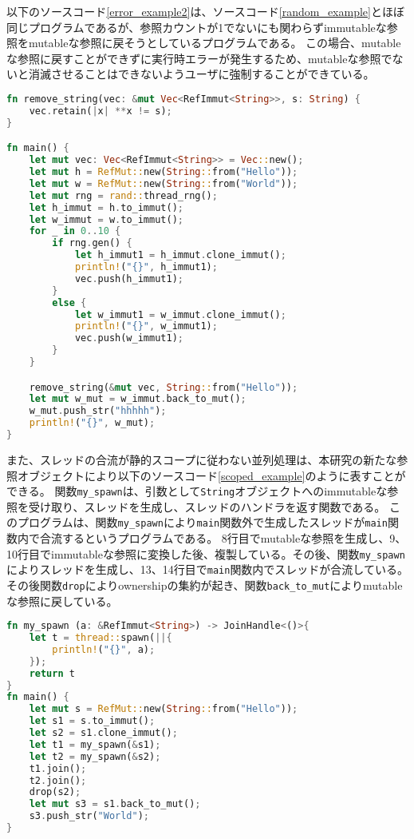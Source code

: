 \documentclass{sumiilab-paper}
\theoremstyle{mystyle}
\numberwithin{definition}{chapter} %
\begin{document}
以下のソースコード\ref{error_example2}は、ソースコード\ref{random_example}とほぼ同じプログラムであるが、参照カウントが1でないにも関わらずimmutableな参照をmutableな参照に戻そうとしているプログラムである。
この場合、mutableな参照に戻すことができずに実行時エラーが発生するため、mutableな参照でないと消滅させることはできないようユーザに強制することができている。
\begin{lstlisting}[language=Rust, caption=mutableな参照へ戻せないことを検出する例, label=error_example2, captionpos=b]
fn remove_string(vec: &mut Vec<RefImmut<String>>, s: String) {
    vec.retain(|x| **x != s);
}

fn main() {
    let mut vec: Vec<RefImmut<String>> = Vec::new();
    let mut h = RefMut::new(String::from("Hello"));
    let mut w = RefMut::new(String::from("World"));
    let mut rng = rand::thread_rng();
    let h_immut = h.to_immut();
    let w_immut = w.to_immut();
    for _ in 0..10 {
        if rng.gen() {
            let h_immut1 = h_immut.clone_immut();
            println!("{}", h_immut1);
            vec.push(h_immut1);
        }
        else {
            let w_immut1 = w_immut.clone_immut();
            println!("{}", w_immut1);
            vec.push(w_immut1);
        }
    }

    remove_string(&mut vec, String::from("Hello"));
    let mut w_mut = w_immut.back_to_mut();
    w_mut.push_str("hhhhh");
    println!("{}", w_mut);
}
\end{lstlisting}

また、スレッドの合流が静的スコープに従わない並列処理は、本研究の新たな参照オブジェクトにより以下のソースコード\ref{scoped_example}のように表すことができる。
関数\texttt{my\_spawn}は、引数として\texttt{String}オブジェクトへのimmutableな参照を受け取り、スレッドを生成し、スレッドのハンドラを返す関数である。
このプログラムは、関数\texttt{my\_spawn}により\texttt{main}関数外で生成したスレッドが\texttt{main}関数内で合流するというプログラムである。
8行目でmutableな参照を生成し、9、10行目でimmutableな参照に変換した後、複製している。その後、関数\texttt{my\_spawn}によりスレッドを生成し、13、14行目で\texttt{main}関数内でスレッドが合流している。その後関数\texttt{drop}によりownershipの集約が起き、関数\texttt{back\_to\_mut}によりmutableな参照に戻している。
\begin{lstlisting}[language=Rust, caption=新たな参照オブジェクトを用いた並列処理の例, label=scoped_example, captionpos=b]
fn my_spawn (a: &RefImmut<String>) -> JoinHandle<()>{
    let t = thread::spawn(||{
        println!("{}", a);
    });
    return t
}
fn main() {
    let mut s = RefMut::new(String::from("Hello"));
    let s1 = s.to_immut();
    let s2 = s1.clone_immut(); 
    let t1 = my_spawn(&s1);
    let t2 = my_spawn(&s2); 
    t1.join();
    t2.join();
    drop(s2);
    let mut s3 = s1.back_to_mut();
    s3.push_str("World");
}
\end{lstlisting}
\end{document}

